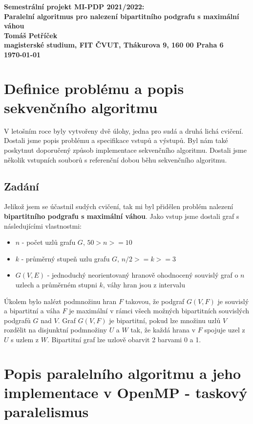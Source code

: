 \documentclass{article}
\begin{document}
\begin{center}
\bf Semestrální projekt MI-PDP 2021/2022:\\[5mm]
    Paralelní algoritmus pro nalezení bipartitního podgrafu s maximální váhou\\[5mm]
       Tomáš Petříček\\[2mm]
magisterské studium, FIT ČVUT, Thákurova 9, 160 00 Praha 6\\[2mm]
\today
\end{center}

\section{Definice problému a popis sekvenčního algoritmu}
V letošním roce byly vytvořeny dvě úlohy, jedna pro sudá a druhá lichá cvičení.
Dostali jsme popis problému a specifikace vstupů a výstupů.
Byl nám také poskytnut doporučený způsob implementace sekvenčního algoritmu.
Dostali jsme několik vstupních souborů s referenční dobou běhu sekvenčního algoritmu.

\subsection{Zadání}
Jelikož jsem se účastnil sudých cvičení, tak mi byl přidělen problém nalezení \textbf{bipartitního podgrafu s maximální váhou}. Jako vstup jsme dostali graf s následujícími vlastnostmi:

\begin{itemize}
    \item \(n\) - počet uzlů grafu \(G\), \(50 > n >= 10\)
    \item \(k\) - průměrný stupeň uzlu grafu \(G\), \(n/2 >= k >= 3\)
    \item \(G(V,E)\) - jednoduchý neorientovaný hranově ohodnocený souvislý graf o \(n\) uzlech a průměrném stupni \(k\), váhy hran jsou z intervalu \(<80,120>\)
\end{itemize}

Úkolem bylo nalézt podmnožinu hran \(F\) takovou, že podgraf \(G(V,F)\) je souvislý a bipartitní a váha \(F\) je maximální v rámci všech možných bipartitních souvislých podgrafů \(G\) nad \(V\).
Graf \(G(V,F)\) je bipartitní, pokud lze množinu uzlů \(V\) rozdělit na disjunktní podmnožiny \(U\) a \(W\) tak, že každá hrana v \(F\) spojuje uzel z \(U\) s uzlem z \(W\).
Bipartitní graf lze uzlově obarvit 2 barvami 0 a 1.

\section{Popis paralelního algoritmu a jeho implementace v OpenMP - taskový paralelismus}
\end{document}
